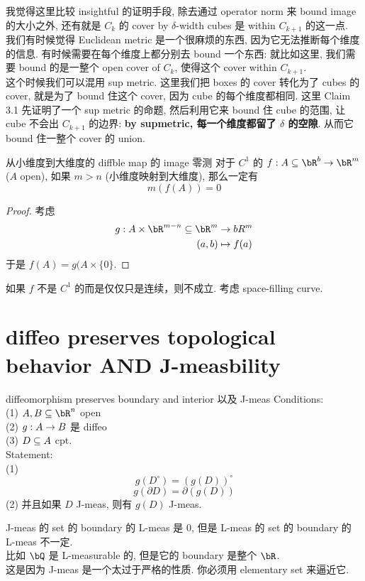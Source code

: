 \documentclass[lang=cn,11pt]{elegantbook}
\begin{document}
\begin{remark}
我觉得这里比较 insightful 的证明手段, 除去通过 operator norm 来 bound image 的大小之外, 还有就是 $C_k$ 的 cover by $\delta$-width cubes 是 within $C_{k+1}$ 的这一点. \\
我们有时候觉得 Euclidean metric 是一个很麻烦的东西, 因为它无法推断每个维度的信息. 有时候需要在每个维度上都分别去 bound 一个东西: 就比如这里, 我们需要 bound 的是一整个 open cover of $C_k$, 使得这个 cover within $C_{k+1}$.\\
这个时候我们可以混用 sup metric. 这里我们把 boxes 的 cover 转化为了 cubes 的 cover, 就是为了 bound 住这个 cover, 因为 cube 的每个维度都相同. 这里 Claim 3.1 先证明了一个 sup metric 的命题, 然后利用它来 bound 住 cube 的范围, 让 cube 不会出 $C_{k+1}$ 的边界: \textbf{by supmetric, 每一个维度都留了 $\delta$ 的空隙}. 从而它 bound 住一整个 cover 的 union. 
\end{remark}





\begin{corollary}{从小维度到大维度的 diffble map 的 image 零测}
    对于 $C^1$ 的 $f: A \sub \bR^b \rar \bR^m $($A$ open), 如果 $m > n$ (小维度映射到大维度), 那么一定有 
    $$
    m(f(A)) = 0
    $$
\end{corollary}
\begin{proof}
    考虑
    \begin{align}
        g: A \times \bR^{m-n} \sub \bR^m &\rar bR^m\\
        (a,b) & \mapsto f(a)
    \end{align}
    于是 $f(A) = g(A \times \{0\}$.
\end{proof}
\begin{remark}
    如果 $f$ 不是 $C^1$ 的而是仅仅只是连续，则不成立. 考虑 space-filling curve.\\
\end{remark}


\section{diffeo preserves topological behavior AND J-measbility}
\begin{theorem}{diffeomorphism preserves boundary and interior 以及 J-meas}
Conditions:\\
(1) $A,B \sub \bR^n$ open\\
(2) $g: A \rightarrow B$ 是 diffeo\\
(3) $D \subseteq A$ cpt.\\
Statement:\\
(1) 
$$
g(D^{\circ}) = (g(D))^{\circ}
$$
$$
g(\partial D) = \partial(g(D))
$$
(2) 并且如果 $D$ J-meas, 则有 $g(D)$ J-meas.
\end{theorem}
\begin{remark}
    J-meas 的 set 的 boundary 的 L-meas 是 0, 但是 L-meas 的 set 的 boundary 的 L-meas 不一定.\\
    比如 $\bQ$ 是 L-measurable 的, 但是它的 boundary 是整个 $\bR$.\\
    这是因为 J-meas 是一个太过于严格的性质. 你必须用 elementary set 来逼近它. 
\end{remark}
\end{document}
